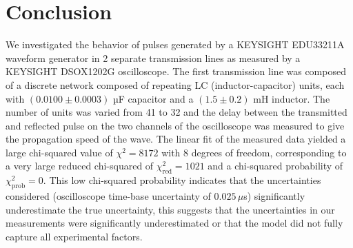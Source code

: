 \documentclass[
	a4paper, %
	10pt, %
	twoside, %
]{journal}
\begin{document}
\section{Conclusion}
We investigated the behavior of pulses generated by a KEYSIGHT EDU33211A waveform generator in 2 separate transmission lines as measured by a KEYSIGHT DSOX1202G oscilloscope. The first transmission line was composed of a discrete network composed of repeating LC (inductor-capacitor) units, each with $(0.0100 \pm 0.0003)$ µF capacitor and a $(1.5 \pm 0.2)$ mH inductor. The number of units was varied from 41 to 32 and the delay between the transmitted and reflected pulse on the two channels of the oscilloscope was measured to give the propagation speed of the wave. 
The linear fit of the measured data yielded a large chi-squared value of $\chi^2 = 8172$ with 8 degrees of freedom, corresponding to a very large reduced chi-squared of $\chi^2_{\mathrm{red}} = 1021$ and a chi-squared probability of $\chi^2_{\mathrm{prob}} = 0$. This low chi-squared probability indicates that the uncertainties considered (oscilloscope time-base uncertainty of $0.025\,\mu$s) significantly underestimate the true uncertainty, this suggests that the uncertainties in our measurements were significantly underestimated or that the model did not fully capture all experimental factors.
\end{document}
